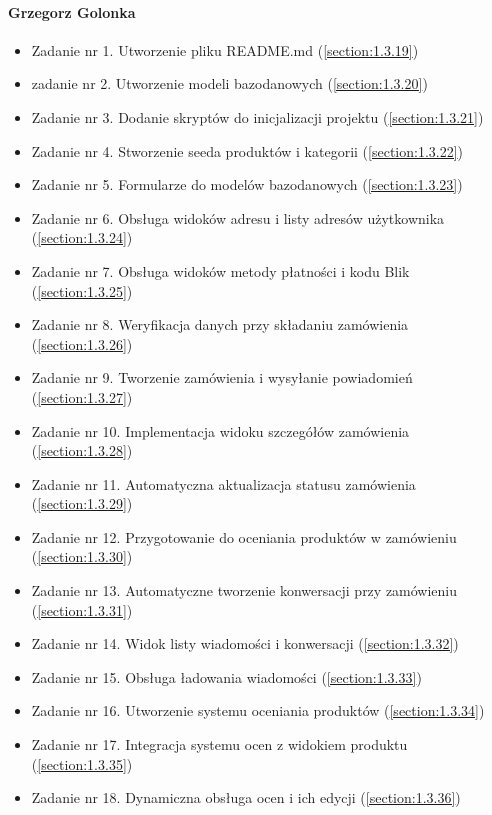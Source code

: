 \documentclass[12pt,a4paper,oneside]{article}
\theoremstyle{definition}
\numberwithin{equation}{section}
\begin{document}
\paragraph{Grzegorz Golonka}
\begin{itemize}
    \item Zadanie nr 1. Utworzenie pliku README.md                          (\ref{section:1.3.19})
    \item zadanie nr 2. Utworzenie modeli bazodanowych                      (\ref{section:1.3.20})
    \item Zadanie nr 3. Dodanie skryptów do inicjalizacji projektu          (\ref{section:1.3.21})
    \item Zadanie nr 4. Stworzenie seeda produktów i kategorii              (\ref{section:1.3.22})
    \item Zadanie nr 5. Formularze do modelów bazodanowych                  (\ref{section:1.3.23})
    \item Zadanie nr 6. Obsługa widoków adresu i listy adresów użytkownika  (\ref{section:1.3.24})
    \item Zadanie nr 7. Obsługa widoków metody płatności i kodu Blik        (\ref{section:1.3.25})
    \item Zadanie nr 8. Weryfikacja danych przy składaniu zamówienia               (\ref{section:1.3.26})
    \item Zadanie nr 9. Tworzenie zamówienia i wysyłanie powiadomień               (\ref{section:1.3.27})
    \item Zadanie nr 10. Implementacja widoku szczegółów zamówienia              (\ref{section:1.3.28})
    \item Zadanie nr 11. Automatyczna aktualizacja statusu zamówienia              (\ref{section:1.3.29})
    \item Zadanie nr 12. Przygotowanie do oceniania produktów w zamówieniu             (\ref{section:1.3.30})
    \item Zadanie nr 13. Automatyczne tworzenie konwersacji przy zamówieniu             (\ref{section:1.3.31})
    \item Zadanie nr 14. Widok listy wiadomości i konwersacji              (\ref{section:1.3.32})
    \item Zadanie nr 15. Obsługa ładowania wiadomości              (\ref{section:1.3.33})
    \item Zadanie nr 16. Utworzenie systemu oceniania produktów             (\ref{section:1.3.34})
    \item Zadanie nr 17. Integracja systemu ocen z widokiem produktu            (\ref{section:1.3.35})
    \item Zadanie nr 18.  Dynamiczna obsługa ocen i ich edycji             (\ref{section:1.3.36})

\end{itemize}
\end{document}
